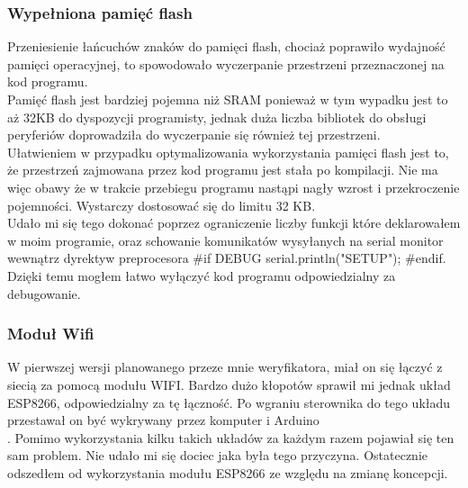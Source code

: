 \documentclass[declaration,shortabstract, mgr]{iithesis}
\begin{document}
\subsubsection{Wypełniona pamięć flash}
\indent Przeniesienie łańcuchów znaków do pamięci flash, chociaż poprawiło wydajność pamięci operacyjnej, to spowodowało wyczerpanie przestrzeni przeznaczonej na kod programu. \\
\indent Pamięć flash jest bardziej pojemna niż SRAM ponieważ w tym wypadku jest to aż 32KB do dyspozycji programisty, jednak duża liczba bibliotek do obsługi peryferiów doprowadziła do wyczerpanie się również tej przestrzeni. \\
\indent Ułatwieniem w przypadku optymalizowania wykorzystania pamięci flash jest to, że przestrzeń zajmowana przez kod programu jest stała po kompilacji. Nie ma więc obawy że w trakcie przebiegu programu nastąpi nagły wzrost i przekroczenie pojemności. Wystarczy dostosować się do limitu 32 KB. \\
\indent Udało mi się tego dokonać poprzez ograniczenie liczby funkcji które deklarowałem w moim programie, oraz schowanie komunikatów wysyłanych na serial monitor wewnątrz dyrektyw preprocesora \#if DEBUG serial.println("SETUP"); \#endif. Dzięki temu mogłem łatwo wyłączyć kod programu odpowiedzialny za debugowanie.\\
\subsubsection{Moduł Wifi}
\indent W pierwszej wersji planowanego przeze mnie weryfikatora, miał on się łączyć z siecią za pomocą modułu WIFI. Bardzo dużo kłopotów sprawił mi jednak układ ESP8266, odpowiedzialny za tę łączność. Po wgraniu sterownika do tego układu przestawał on być wykrywany przez komputer i Arduino\\. 
\indent Pomimo wykorzystania kilku takich układów za każdym razem pojawiał się ten sam problem. Nie udało mi się dociec jaka była tego przyczyna. Ostatecznie odszedłem od wykorzystania modułu ESP8266 ze względu na zmianę koncepcji.
\end{document}
